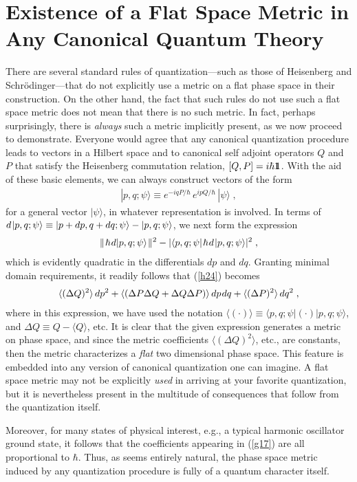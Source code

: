 \documentclass[12pt]{article}
\def\one{1\hskip-.37em 1}
\def\De{\Delta}
\def\s{\hskip.08em}
\def\bn{\begin{eqnarray}}     %
\def\en{\end{eqnarray}}       %
\def\<{\langle}
\def\>{\rangle}
\begin{document}
\section{Existence of a Flat Space Metric in Any Canonical Quantum Theory}
There are several standard rules of quantization---such as those of 
Heisenberg and Schr\"odinger---that do not explicitly use a metric on a 
flat phase space in their construction. On the other hand, the fact that 
such rules do not use such a flat space metric does not mean that there 
is no such metric. In fact, perhaps surprisingly, there is {\it always} 
such a metric implicitly present, as we now proceed to demonstrate. Everyone 
would agree that any canonical quantization procedure leads to vectors in a 
Hilbert space and to canonical self adjoint operators $Q$ and $P$ that 
satisfy the Heisenberg commutation relation, $[Q,P]=i\hbar\one$. With the 
aid of these basic elements, we can always construct vectors of the form
  \bn  |p,q;\psi\>\equiv e^{-iqP/\hbar}\,e^{ipQ/\hbar}\,|\psi\>\;,  \en
for a general vector $|\psi\>$, in whatever representation is involved. In 
terms of $d\s|p,q;\psi\>\equiv|p+dp,q+dq;\psi\>-|p,q;\psi\>$, we next form 
the expression
  \bn  \|\s\hbar\s d|p,q;\psi\>\s\|^2-
|\<p,q;\psi|\s\hbar\s d\s |p,q;\psi\>|^2 \;, \label{h24}\en
which is evidently quadratic in the differentials $dp$ and $dq$. 
Granting minimal domain requirements, it readily follows that (\ref{h24}) 
becomes
 \bn  \<(\De Q)^2\>\, dp^2+\<(\De P\De Q+\De Q\De P)\>\, dp\s dq+
\<(\De P)^2\>\,dq^2\;,  \label{g17}\en
where in this expression, we have used the notation 
  $\<(\cdot)\>\equiv\<p,q;\psi|(\cdot)|p,q;\psi\>$, and 
$\De Q\equiv Q-\<Q\>$, etc. It is clear that the given expression 
generates a metric on phase space, and since the metric coefficients 
$\<(\De Q)^2\>$, etc.,  are constants, then the metric characterizes a 
{\it flat} two dimensional phase space. This feature is embedded into 
any version of canonical quantization one can imagine. A flat space 
metric may not be explicitly {\it used} in arriving at your favorite 
quantization, but it is nevertheless present in the multitude of 
consequences that follow from the quantization itself. 

Moreover, for many states of physical interest, e.g., a typical harmonic 
oscillator ground state, it follows that the coefficients appearing in 
(\ref{g17}) are all proportional to $\hbar$. Thus, as seems entirely 
natural, the phase space metric induced by any quantization procedure is 
fully of a quantum character itself.
\end{document}
